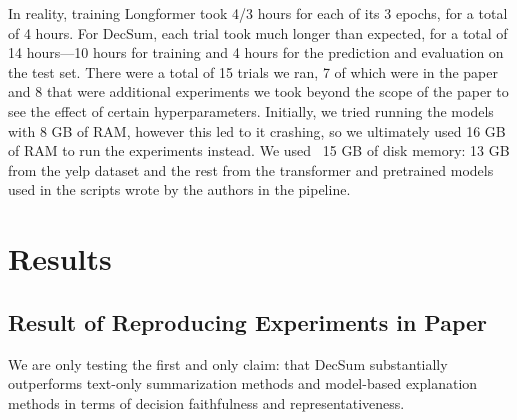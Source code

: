 \documentclass{article}
\begin{document}
In reality, training Longformer took 4/3 hours for each of its 3 epochs, for a total of 4 hours. For DecSum, each trial took much longer than expected, for a total of 14 hours—10 hours for training
and 4 hours for the prediction and evaluation on the test set.
There were a total of 15 trials we ran, 7 of which were in the paper and 8 that were additional experiments we took beyond the scope of the paper to see
the effect of certain hyperparameters. Initially, we tried running the models with 8 GB of RAM, however this led to it crashing, so we ultimately used 16 GB of RAM to run the experiments instead.
We used ~15 GB of disk memory: 13 GB from the yelp dataset and the rest from the transformer and pretrained models used in the scripts wrote by the authors in the pipeline.

\section{Results}

\subsection{Result of Reproducing Experiments in Paper}

We are only testing the first and only claim:
that DecSum substantially outperforms text-only summarization methods and model-based explanation methods in terms of decision faithfulness and representativeness.
\end{document}
